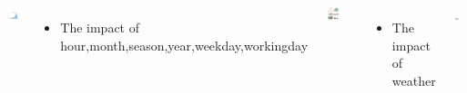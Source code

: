 \documentclass{tikzposter} %
\begin{document}
\begin{columns}
{\begin{minipage}{0.33\linewidth}
        \centering
        \includegraphics[width=1\textwidth]{pic1/log.png} 
    \end{minipage}
    \begin{itemize}                            
        \item
        The impact of hour,month,season,year,weekday,workingday
    \end{itemize}
    \begin{minipage}{1\linewidth}
        \centering
        \includegraphics[width=0.5\textwidth]{pic1/count all.png} 
    \end{minipage}
    \begin{itemize}                            
        \item
        The impact of weather
    \end{itemize}
    \begin{minipage}{1\linewidth}
        \centering
        \includegraphics[width=0.4\textwidth]{pic1/weather.png} 
    \end{minipage}
}



\end{columns}
\end{document}

